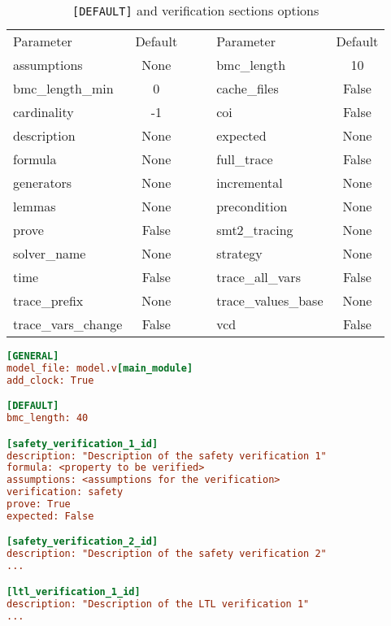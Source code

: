 \documentclass{article}
\theoremstyle{definition}
\begin{document}
\begin{table}[h]
  \centering
\begin{tabular}{ l c c l c }
  Parameter & Default & & Parameter & Default \\ \cline{1-2} \cline{4-5}
assumptions & None & ~~ & bmc\_length & 10 \\
bmc\_length\_min & 0 & ~~ & cache\_files & False \\
cardinality & -1 & ~~ & coi & False \\
description & None & ~~ & expected & None \\
formula & None & ~~ & full\_trace & False \\
generators & None & ~~ & incremental & None \\
lemmas & None & ~~ & precondition & None \\
prove & False & ~~ & smt2\_tracing & None \\
solver\_name & None & ~~ & strategy & None \\
time & False & ~~ & trace\_all\_vars & False \\
trace\_prefix & None & ~~ & trace\_values\_base & None \\
trace\_vars\_change & False & ~~ & vcd & False
\end{tabular}
\label{tab:verification_section}
\caption{\texttt{[DEFAULT]} and verification sections options}
\end{table}



\begin{lstlisting}[frame=single,language=Ini,caption=Problem file example,label=problem_file]
[GENERAL]
model_file: model.v[main_module]
add_clock: True

[DEFAULT]
bmc_length: 40

[safety_verification_1_id]
description: "Description of the safety verification 1"
formula: <property to be verified>
assumptions: <assumptions for the verification>
verification: safety
prove: True
expected: False

[safety_verification_2_id]
description: "Description of the safety verification 2"
...

[ltl_verification_1_id]
description: "Description of the LTL verification 1"
...

\end{lstlisting}
\end{document}

